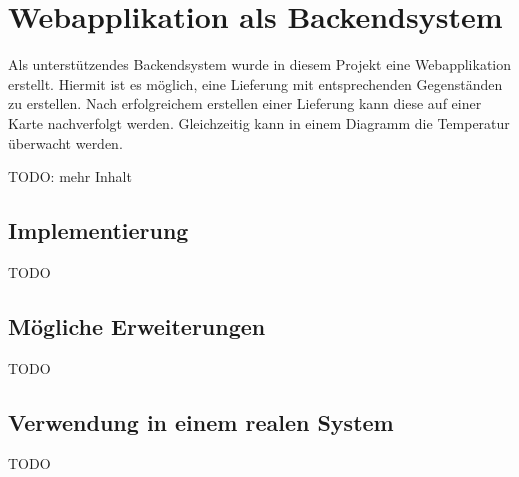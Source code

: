 \section{Webapplikation als Backendsystem}
\label{sec:webapplication}

Als unterstützendes Backendsystem wurde in diesem Projekt eine Webapplikation
	erstellt. Hiermit ist es möglich, eine Lieferung mit entsprechenden
	Gegenständen zu erstellen. Nach erfolgreichem erstellen einer Lieferung
	kann diese auf einer Karte nachverfolgt werden. Gleichzeitig kann in
	einem Diagramm die Temperatur überwacht werden.
	
TODO: mehr Inhalt

\subsection{Implementierung}

TODO

\subsection{Mögliche Erweiterungen}

TODO

\subsection{Verwendung in einem realen System}

TODO